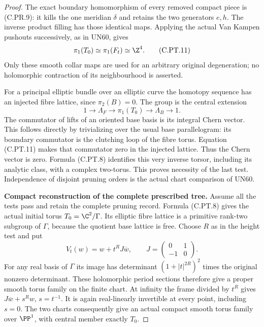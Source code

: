 \begin{proof}
The exact boundary homomorphism of every
removed compact piece is (C.PR.9): it kills
the one meridian $\delta$ and retains the
two generators $e,h$. The inverse product
filling has those identical maps. Applying
the actual Van Kampen pushouts successively,
as in UN60, gives
\[
                         \pi_1(T_0)\simeq\pi_1(F_t)
                                             \simeq\Z^4.
 \tag{C.PT.11}
\]
Only these smooth collar maps are used for
an arbitrary original degeneration; no
holomorphic contraction of its neighbourhood
is asserted.

For a principal elliptic bundle over an
elliptic curve the homotopy sequence has
an injected fibre lattice, since
$\pi_2(B)=0$. The group is the central
extension
\[
 1\longrightarrow\Lambda_F
 \longrightarrow\pi_1(T_0)
 \longrightarrow\Lambda_B\longrightarrow1.
 \tag{C.PT.12}
\]
The commutator of lifts of an oriented
base basis is its integral Chern vector.
This follows directly by trivializing over
the usual base parallelogram: its boundary
commutator is the clutching loop of the
fibre torus. Equation (C.PT.11) makes that
commutator zero in the injected lattice.
Thus the Chern vector is zero. Formula
(C.PT.8) identifies this very inverse
torsor, including its analytic class,
with a complex two-torus. This proves
necessity of the last test. Independence
of disjoint pruning orders is the actual
chart comparison of UN60.

\par\medskip\noindent\textbf{Compact reconstruction of the complete prescribed tree.}
Assume all the tests pass and retain the
complete pruning record. Formula (C.PT.8)
gives the actual initial torus
$T_0=\C^2/\Gamma$. Its elliptic fibre
lattice is a primitive rank-two subgroup
of $\Gamma$, because the quotient base
lattice is free. Choose $R$ as in the
height test and put
\[
 V_t(w)=w+t^R J\overline w,\qquad
              J=\begin{pmatrix}0&1\\-1&0\end{pmatrix}.
 \tag{C.PT.13}
\]
For any real basis of $\Gamma$ its image
has determinant $(1+|t|^{2R})^2$ times
the original nonzero determinant.
These holomorphic period sections
therefore give a proper smooth torus
family on the finite chart. At infinity
the frame divided by $t^R$ gives
$J\overline w+s^Rw$, $s=t^{-1}$.
It is again real-linearly invertible
at every point, including $s=0$.
The two charts consequently give an
actual compact smooth torus family
over $\PP^1$, with central member
exactly $T_0$.


\end{proof}
